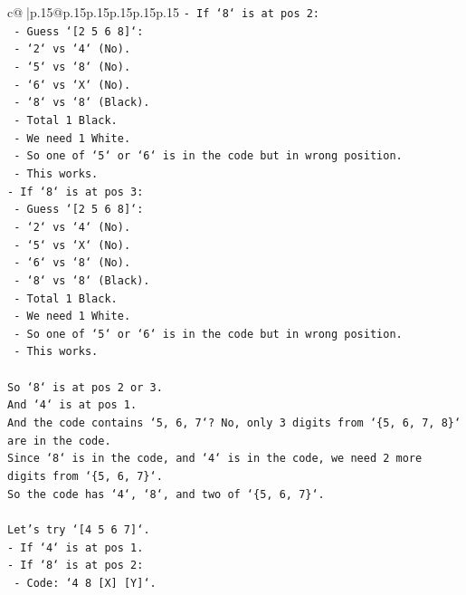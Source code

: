 \documentclass{article}
\begin{document}
{\begin{supertabular}{c@{$\;$}|p{.15\linewidth}@{}p{.15\linewidth}p{.15\linewidth}p{.15\linewidth}p{.15\linewidth}p{.15\linewidth}}
{{{\texttt{{-} If `8` is at pos 2:} \\
\texttt{    {-} Guess `{[}2 5 6 8{]}`:} \\
\texttt{        {-} `2` vs `4` (No).} \\
\texttt{        {-} `5` vs `8` (No).} \\
\texttt{        {-} `6` vs `X` (No).} \\
\texttt{        {-} `8` vs `8` (Black).} \\
\texttt{        {-} Total 1 Black.} \\
\texttt{        {-} We need 1 White.} \\
\texttt{        {-} So one of `5` or `6` is in the code but in wrong position.} \\
\texttt{        {-} This works.} \\
\texttt{{-} If `8` is at pos 3:} \\
\texttt{    {-} Guess `{[}2 5 6 8{]}`:} \\
\texttt{        {-} `2` vs `4` (No).} \\
\texttt{        {-} `5` vs `X` (No).} \\
\texttt{        {-} `6` vs `8` (No).} \\
\texttt{        {-} `8` vs `8` (Black).} \\
\texttt{        {-} Total 1 Black.} \\
\texttt{        {-} We need 1 White.} \\
\texttt{        {-} So one of `5` or `6` is in the code but in wrong position.} \\
\texttt{        {-} This works.} \\
\\ 
\texttt{So `8` is at pos 2 or 3.} \\
\texttt{And `4` is at pos 1.} \\
\texttt{And the code contains `5, 6, 7`? No, only 3 digits from `\{5, 6, 7, 8\}` are in the code.} \\
\texttt{Since `8` is in the code, and `4` is in the code, we need 2 more digits from `\{5, 6, 7\}`.} \\
\texttt{So the code has `4`, `8`, and two of `\{5, 6, 7\}`.} \\
\\ 
\texttt{Let's try `{[}4 5 6 7{]}`.} \\
\texttt{{-} If `4` is at pos 1.} \\
\texttt{{-} If `8` is at pos 2:} \\
\texttt{    {-} Code: `4 8 {[}X{]} {[}Y{]}`.} \\
}}}
\end{supertabular}}
\end{document}
